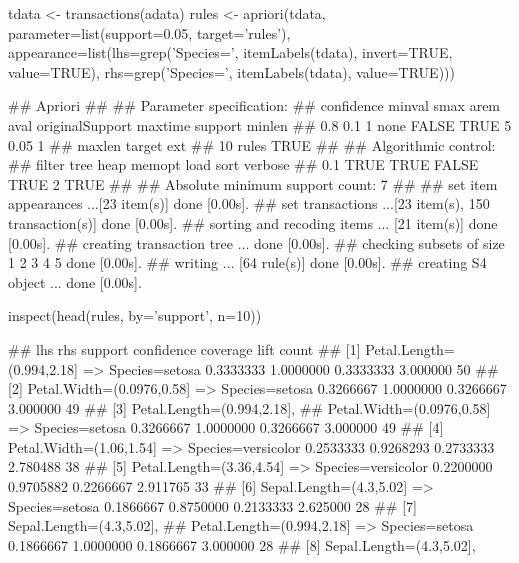 \documentclass{article}\usepackage[]{graphicx}\usepackage[]{color}
\begin{document}
\begin{Schunk}
\begin{Sinput}
tdata <- transactions(adata)
rules <- apriori(tdata, 
                 parameter=list(support=0.05,
                                target='rules'),
                 appearance=list(lhs=grep('Species=', itemLabels(tdata), invert=TRUE, value=TRUE),
                                 rhs=grep('Species=', itemLabels(tdata), value=TRUE)))
\end{Sinput}
\begin{Soutput}
## Apriori
## 
## Parameter specification:
##  confidence minval smax arem  aval originalSupport maxtime support minlen
##         0.8    0.1    1 none FALSE            TRUE       5    0.05      1
##  maxlen target  ext
##      10  rules TRUE
## 
## Algorithmic control:
##  filter tree heap memopt load sort verbose
##     0.1 TRUE TRUE  FALSE TRUE    2    TRUE
## 
## Absolute minimum support count: 7 
## 
## set item appearances ...[23 item(s)] done [0.00s].
## set transactions ...[23 item(s), 150 transaction(s)] done [0.00s].
## sorting and recoding items ... [21 item(s)] done [0.00s].
## creating transaction tree ... done [0.00s].
## checking subsets of size 1 2 3 4 5 done [0.00s].
## writing ... [64 rule(s)] done [0.00s].
## creating S4 object  ... done [0.00s].
\end{Soutput}
\begin{Sinput}
inspect(head(rules, by='support', n=10))
\end{Sinput}
\begin{Soutput}
##      lhs                            rhs                    support confidence  coverage     lift count
## [1]  {Petal.Length=(0.994,2.18]} => {Species=setosa}     0.3333333  1.0000000 0.3333333 3.000000    50
## [2]  {Petal.Width=(0.0976,0.58]} => {Species=setosa}     0.3266667  1.0000000 0.3266667 3.000000    49
## [3]  {Petal.Length=(0.994,2.18],                                                                      
##       Petal.Width=(0.0976,0.58]} => {Species=setosa}     0.3266667  1.0000000 0.3266667 3.000000    49
## [4]  {Petal.Width=(1.06,1.54]}   => {Species=versicolor} 0.2533333  0.9268293 0.2733333 2.780488    38
## [5]  {Petal.Length=(3.36,4.54]}  => {Species=versicolor} 0.2200000  0.9705882 0.2266667 2.911765    33
## [6]  {Sepal.Length=(4.3,5.02]}   => {Species=setosa}     0.1866667  0.8750000 0.2133333 2.625000    28
## [7]  {Sepal.Length=(4.3,5.02],                                                                        
##       Petal.Length=(0.994,2.18]} => {Species=setosa}     0.1866667  1.0000000 0.1866667 3.000000    28
## [8]  {Sepal.Length=(4.3,5.02],                                                                        
}
\end{Soutput}
\end{Schunk}
\end{document}

